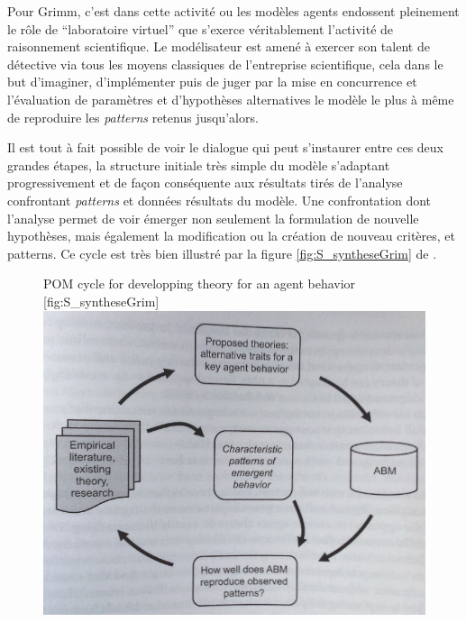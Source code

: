 Pour Grimm, c'est dans cette activité ou les modèles agents endossent pleinement le rôle de \enquote{laboratoire virtuel} que s'exerce véritablement l'activité de raisonnement scientifique. Le modélisateur est amené à exercer son talent de détective via tous les moyens classiques de l'entreprise scientifique, cela dans le but d'imaginer, d'implémenter puis de juger par la mise en concurrence et l'évaluation de paramètres et d'hypothèses alternatives le modèle le plus à même de reproduire les \textit{patterns} retenus jusqu'alors. 

Il est tout à fait possible de voir le dialogue qui peut s'instaurer entre ces deux grandes étapes, la structure initiale très simple du modèle s'adaptant progressivement et de façon conséquente aux résultats tirés de l'analyse confrontant \textit{patterns} et données résultats du modèle. Une confrontation dont l'analyse permet de voir émerger non seulement la formulation de nouvelle hypothèses, mais également la modification ou la création de nouveau critères, et patterns. Ce cycle est très bien illustré par la figure \ref{fig:S_syntheseGrim} de \textcite{Railsback2012}.

\begin{figure}[h]
\begin{sidecaption}[fortoc]{ POM cycle for developping theory for an agent behavior \autocite[245]{Railsback2012}}[fig:S_syntheseGrim]
  \centering
 \includegraphics[width=.9\linewidth]{cyclePOMcomportement.png}
  \end{sidecaption}
\end{figure}

